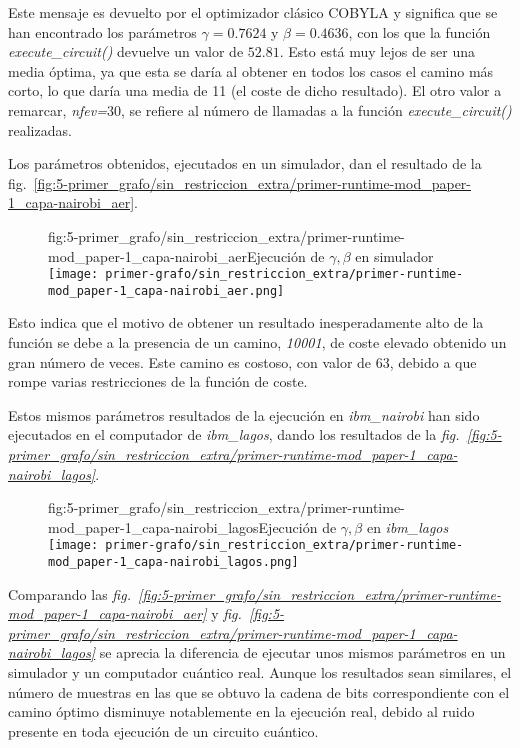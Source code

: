 Este mensaje es devuelto por el optimizador clásico COBYLA y significa que se han encontrado los parámetros $\gamma = 0.7624$ y $\beta = 0.4636$, con los que la función \textit{execute\_circuit()} devuelve un valor de $52.81$.
Esto está muy lejos de ser una media óptima, ya que esta se daría al obtener en todos los casos el camino más corto, lo que daría una media de 11 (el coste de dicho resultado).
El otro valor a remarcar, \textit{nfev=$30$}, se refiere al número de llamadas a la función \textit{execute\_circuit()} realizadas.

Los parámetros obtenidos, ejecutados en un simulador, dan el resultado de la fig.~\ref{fig:5-primer_grafo/sin_restriccion_extra/primer-runtime-mod_paper-1_capa-nairobi_aer}.

\begin{figure}[Resultados QAOA {--} artículo de Urgelles \textit{et al.} (2022) {--} ejecución en simulador]{fig:5-primer_grafo/sin_restriccion_extra/primer-runtime-mod_paper-1_capa-nairobi_aer}{Ejecución de $\gamma, \beta$ en simulador}
  \centering
  \texttt{[image: primer-grafo/sin\_restriccion\_extra/primer-runtime-mod\_paper-1\_capa-nairobi\_aer.png]}
\end{figure}

Esto indica que el motivo de obtener un resultado inesperadamente alto de la función se debe a la presencia de un camino, \textit{10001}, de coste elevado obtenido un gran número de veces. Este camino es costoso, con valor de 63, debido a que rompe varias restricciones de la función de coste.

Estos mismos parámetros resultados de la ejecución en \textit{ibm\_nairobi} han sido ejecutados en el computador de \textit{ibm\_lagos}, dando los resultados de la \textit{fig.~\ref{fig:5-primer_grafo/sin_restriccion_extra/primer-runtime-mod_paper-1_capa-nairobi_lagos}}.

\begin{figure}[Resultados QAOA {--} artículo de Urgelles \textit{et al.} (2022) {--} ejecución en computador real]{fig:5-primer_grafo/sin_restriccion_extra/primer-runtime-mod_paper-1_capa-nairobi_lagos}{Ejecución de $\gamma, \beta$ en \textit{ibm\_lagos}}
  \centering
  \texttt{[image: primer-grafo/sin\_restriccion\_extra/primer-runtime-mod\_paper-1\_capa-nairobi\_lagos.png]}
\end{figure}

Comparando las \textit{fig.~\ref{fig:5-primer_grafo/sin_restriccion_extra/primer-runtime-mod_paper-1_capa-nairobi_aer}} y \textit{fig.~\ref{fig:5-primer_grafo/sin_restriccion_extra/primer-runtime-mod_paper-1_capa-nairobi_lagos}}
se aprecia la diferencia de ejecutar unos mismos parámetros en un simulador y un computador cuántico real.
Aunque los resultados sean similares, el número de muestras en las que se obtuvo la cadena de bits correspondiente con el camino óptimo disminuye notablemente en la ejecución real, debido al ruido presente en toda ejecución de un circuito cuántico.


